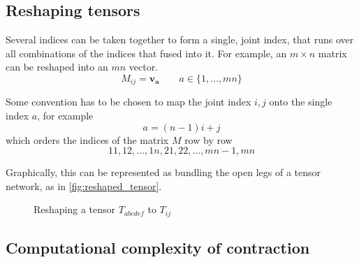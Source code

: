 \subsection{Reshaping tensors}
Several indices can be taken together to form a single, joint index, that runs over all
combinations of the indices that fused into it. For example, an $m \times n$ matrix can be
reshaped into an $m n$ vector.
\begin{equation}
  M_{i j} = \bm{v_a} \qquad a \in \{ 1, \dots, m n \}
\end{equation}

Some convention has to be chosen to map the joint index $i, j$ onto the single index $a$,
for example
\begin{equation}
  a = (n - 1)i + j
\end{equation}
which orders the indices of the matrix $M$ row by row
\begin{equation}
  1 1, 1 2, \dots, 1 n, 2 1, 2 2, \dots, m n - 1, m n
\end{equation}

Graphically, this can be represented as bundling the open legs of a tensor network, as in
\autoref{fig:reshaped_tensor}.

\begin{figure}
  
  \caption{Reshaping a tensor $T_{a b c d e f}$ to $T_{i j}$}
  \label{fig:reshaped_tensor}
\end{figure}



\subsection{Computational complexity of contraction}
